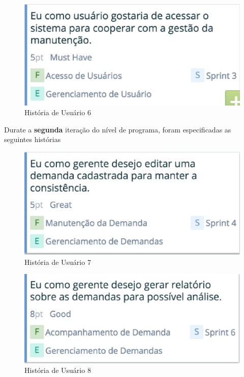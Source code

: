 \begin{figure}[H]
    \centering
	\includegraphics[keepaspectratio=true,scale=0.5]{figuras/time6.eps}
    \caption{História de Usuário 6}
    \label{fig:roadmap}
\end{figure}

Durate a \textbf{segunda} iteração do nível de programa, foram especificadas as seguintes histórias

\begin{figure}[H]
    \centering
	\includegraphics[keepaspectratio=true,scale=0.5]{figuras/time7.eps}
    \caption{História de Usuário 7}
    \label{fig:roadmap}
\end{figure}

\begin{figure}[H]
    \centering
	\includegraphics[keepaspectratio=true,scale=0.5]{figuras/time8.eps}
    \caption{História de Usuário 8}
    \label{fig:roadmap}
\end{figure}

